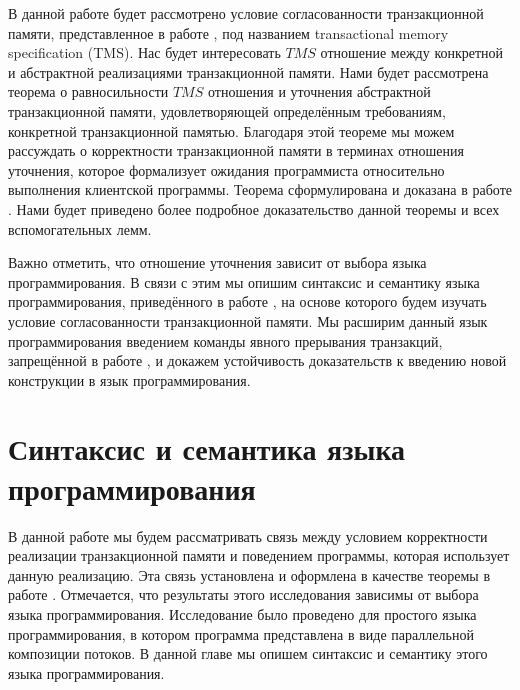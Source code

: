 В данной работе будет рассмотрено условие согласованности транзакционной памяти, представленное в работе \cite{tms_article}, под названием transactional memory specification (TMS). Нас будет интересовать $TMS$ отношение между конкретной и абстрактной реализациями транзакционной памяти. 
Нами будет рассмотрена теорема о равносильности $TMS$ отношения и уточнения абстрактной транзакционной памяти, удовлетворяющей определённым требованиям, конкретной транзакционной памятью. Благодаря этой теореме мы можем рассуждать о корректности транзакционной памяти в терминах отношения уточнения, которое формализует ожидания программиста относительно выполнения клиентской программы. Теорема сформулирована и доказана в работе \cite{tms_article}. Нами будет приведено более подробное доказательство данной теоремы и всех вспомогательных лемм. 

Важно отметить, что отношение уточнения зависит от выбора языка программирования. В связи с этим мы опишим синтаксис и семантику языка программирования, приведённого в работе \cite{tms_article}, на основе которого будем изучать условие согласованности транзакционной памяти. Мы расширим данный язык программирования введением команды явного прерывания транзакций, запрещённой в работе \cite{tms_article}, и докажем устойчивость доказательств к введению новой конструкции в язык программирования.

\chapter{Синтаксис и семантика языка программирования}
В данной работе мы будем рассматривать связь между условием корректности реализации транзакционной памяти и поведением программы, которая использует данную реализацию. Эта связь установлена и оформлена в качестве теоремы в работе \cite{tms_article}. Отмечается, что результаты этого исследования зависимы от выбора языка программирования. Исследование \cite{tms_article} было проведено для простого языка программирования, в котором программа представлена в виде параллельной композиции потоков. В данной главе мы опишем синтаксис и семантику этого языка программирования.

